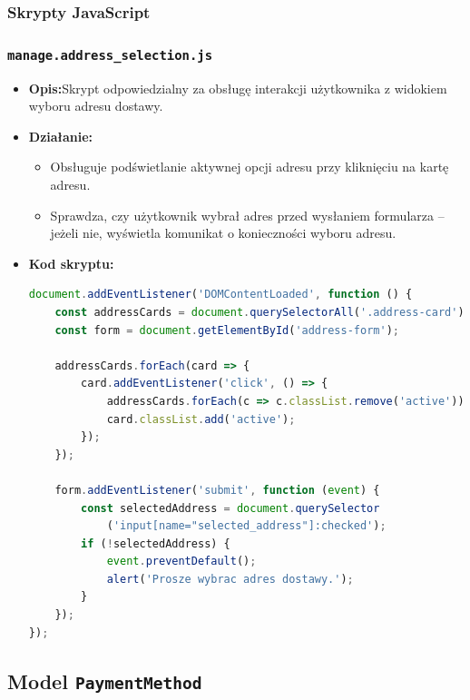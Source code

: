 \documentclass[12pt,a4paper,oneside]{article}
\theoremstyle{definition}
\numberwithin{equation}{section}
\begin{document}
\subsubsection{Skrypty JavaScript}

\subsubsection*{\texttt{manage.address\_selection.js}}
\begin{itemize}
    \item \textbf{Opis:}Skrypt odpowiedzialny za obsługę interakcji użytkownika z widokiem wyboru adresu dostawy.
    \item \textbf{Działanie:}
        \begin{itemize}
            \item Obsługuje podświetlanie aktywnej opcji adresu przy kliknięciu na kartę adresu.
            \item Sprawdza, czy użytkownik wybrał adres przed wysłaniem formularza – jeżeli nie, wyświetla komunikat o konieczności wyboru adresu.
        \end{itemize}
    \item \textbf{Kod skryptu:}
\begin{lstlisting}[language=JavaScript, caption=Skrypt \texttt{manage.address\_selection.js}]
document.addEventListener('DOMContentLoaded', function () {
    const addressCards = document.querySelectorAll('.address-card');
    const form = document.getElementById('address-form');

    addressCards.forEach(card => {
        card.addEventListener('click', () => {
            addressCards.forEach(c => c.classList.remove('active'));
            card.classList.add('active');
        });
    });

    form.addEventListener('submit', function (event) {
        const selectedAddress = document.querySelector
            ('input[name="selected_address"]:checked');
        if (!selectedAddress) {
            event.preventDefault();
            alert('Prosze wybrac adres dostawy.');
        }
    });
});
\end{lstlisting}
\end{itemize}


% 
% 
\clearpage
\subsection{Model \texttt{PaymentMethod}}
\end{document}
